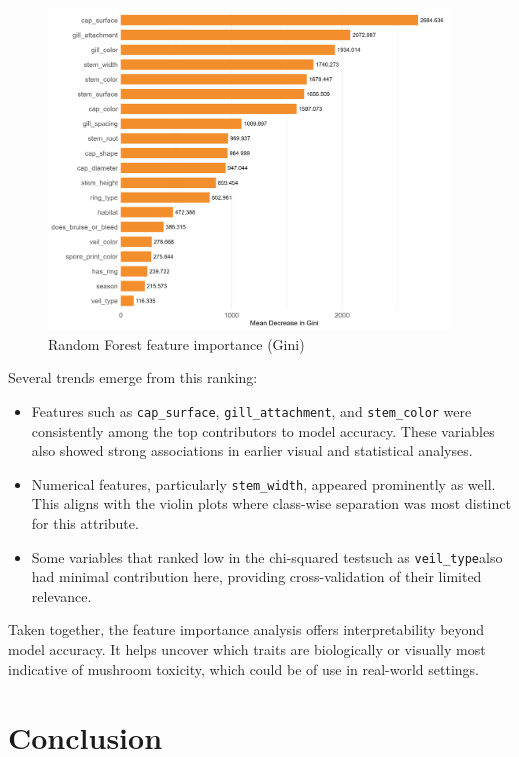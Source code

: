 \documentclass[a4paper,11pt]{article}
\begin{document}
\begin{figure}[h]
\centering
\includegraphics[width=0.95\textwidth]{Figure4-bar-chart-gini.png}
\caption{Random Forest feature importance (Gini)}
\label{fig:gini}
\end{figure}

Several trends emerge from this ranking:
\begin{itemize}
    \item Features such as \texttt{cap\_surface}, \texttt{gill\_attachment}, and \texttt{stem\_color} were consistently among the top contributors to model accuracy. These variables also showed strong associations in earlier visual and statistical analyses.
    \item Numerical features, particularly \texttt{stem\_width}, appeared prominently as well. This aligns with the violin plots where class-wise separation was most distinct for this attribute.
    \item Some variables that ranked low in the chi-squared test\textemdash such as \texttt{veil\_type}\textemdash also had minimal contribution here, providing cross-validation of their limited relevance.
\end{itemize}

Taken together, the feature importance analysis offers interpretability beyond model accuracy. It helps uncover which traits are biologically or visually most indicative of mushroom toxicity, which could be of use in real-world settings.

\section{Conclusion}
\end{document}
